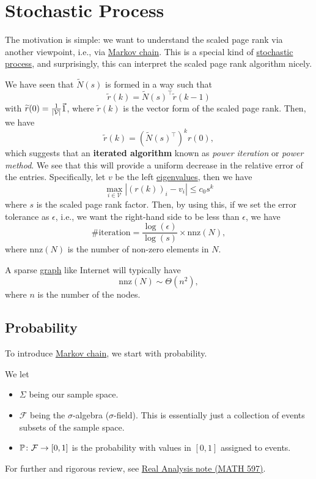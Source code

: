 \chapter{Stochastic Process}
The motivation is simple: we want to understand the scaled page rank via another viewpoint, i.e., via \hyperref[def:Markov-chain]{Markov chain}.
This is a special kind of \hyperref[def:stochastic-process]{stochastic process}, and surprisingly, this can interpret the scaled page rank
algorithm nicely.

\begin{prev}
	We have seen that \(\widetilde{N}(s)\) is formed in a way such that
	\[
		\widetilde{r}(k) = \widetilde{N}(s)^{\top}\widetilde{r}(k - 1)
	\]
	with \(\widetilde{r}(0) = \frac{1}{\left\vert \mathcal{\MakeUppercase{v}} \right\vert }\vec{1}\), where \(\widetilde{r}(k)\) is the vector
	form of the scaled page rank. Then, we have
	\[
		\widetilde{r}(k) = \left(\widetilde{N}(s)^{\top}\right)^k r(0),
	\]
	which suggests that an \textbf{iterated algorithm} known as \emph{power iteration} or \emph{power method}. We see that this will provide
	a uniform decrease in the relative error of the entries. Specifically, let \(v\) be the left \hyperref[def:eigenvalue]{eigenvalues}, then we have
	\[
		\max_{i\in \mathcal{V}}\left\vert (r(k))_i - v_i\right\vert \leq c_0 s^k
	\]
	where \(s\) is the scaled page rank factor. Then, by using this, if we set the error tolerance as \(\epsilon\), i.e., we want the right-hand
	side to be less than \(\epsilon \), we have
	\[
		\#\text{iteration} = \frac{\log(\epsilon)}{\log(s)}\times \mathrm{nnz}(N),
	\]
	where \(\mathrm{nnz}(N)\) is the number of non-zero elements in \(N\).
	\begin{remark}
		A sparse \hyperref[def:graph]{graph} like Internet will typically have
		\[
			\mathrm{nnz}(N)\sim\Theta(n^2),
		\]
		where \(n\) is the number of the nodes.
	\end{remark}
\end{prev}


\section{Probability}
To introduce \hyperref[def:Markov-chain]{Markov chain}, we start with probability.
\begin{prev}
	We let
	\begin{itemize}
		\item \(\Sigma\) being our sample space.
		\item \(\mathcal{F}\) being the \(\sigma\)-algebra (\(\sigma \)-field). This is essentially just a collection of events subsets of the sample space.
		\item \(\mathbb{\MakeUppercase{P}}\colon \mathcal{\MakeUppercase{f}} \to [0, 1]\) is the probability with values in \([0, 1]\) assigned to events.
	\end{itemize}
	For further and rigorous review, see \href{https://www.pbb.wtf/posts/Notes#real-analysis-math597-umich}{Real Analysis note (MATH 597)}.
\end{prev}

